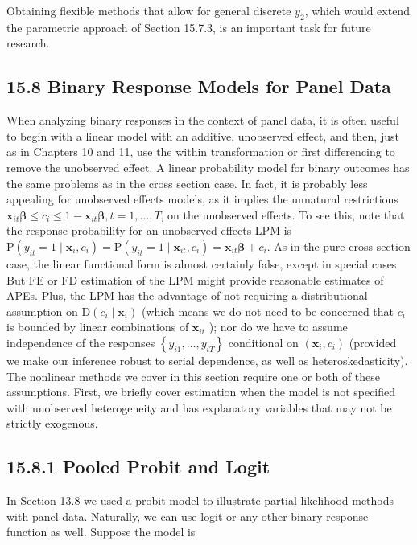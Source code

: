 \documentclass[10pt]{article}
\begin{document}
Obtaining flexible methods that allow for general discrete $y_{2}$, which would extend the parametric approach of Section 15.7.3, is an important task for future research.

\subsection*{15.8 Binary Response Models for Panel Data}
When analyzing binary responses in the context of panel data, it is often useful to begin with a linear model with an additive, unobserved effect, and then, just as in Chapters 10 and 11, use the within transformation or first differencing to remove the unobserved effect. A linear probability model for binary outcomes has the same problems as in the cross section case. In fact, it is probably less appealing for unobserved effects models, as it implies the unnatural restrictions $\mathbf{x}_{i t} \boldsymbol{\beta} \leq c_{i} \leq 1-\mathbf{x}_{i t} \boldsymbol{\beta}, t=1, \ldots, T$, on the unobserved effects. To see this, note that the response probability for an unobserved effects LPM is $\mathrm{P}\left(y_{i t}=1 \mid \mathbf{x}_{i}, c_{i}\right)=\mathrm{P}\left(y_{i t}=1 \mid \mathbf{x}_{i t}, c_{i}\right)= \mathbf{x}_{i t} \boldsymbol{\beta}+c_{i}$. As in the pure cross section case, the linear functional form is almost certainly false, except in special cases. But FE or FD estimation of the LPM might provide reasonable estimates of APEs. Plus, the LPM has the advantage of not requiring a distributional assumption on $\mathrm{D}\left(c_{i} \mid \mathbf{x}_{i}\right)$ (which means we do not need to be concerned that $c_{i}$ is bounded by linear combinations of $\mathbf{x}_{i t}$ ); nor do we have to assume independence of the responses $\left\{y_{i 1}, \ldots, y_{i T}\right\}$ conditional on $\left(\mathbf{x}_{i}, c_{i}\right)$ (provided\\
we make our inference robust to serial dependence, as well as heteroskedasticity). The nonlinear methods we cover in this section require one or both of these assumptions. First, we briefly cover estimation when the model is not specified with unobserved heterogeneity and has explanatory variables that may not be strictly exogenous.

\subsection*{15.8.1 Pooled Probit and Logit}
In Section 13.8 we used a probit model to illustrate partial likelihood methods with panel data. Naturally, we can use logit or any other binary response function as well. Suppose the model is
\end{document}
